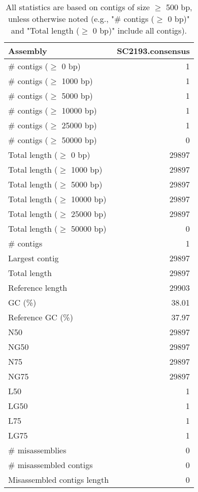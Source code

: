 \documentclass[12pt,a4paper]{article}
\begin{document}
\begin{table}[ht]
\begin{center}
\caption{All statistics are based on contigs of size $\geq$ 500 bp, unless otherwise noted (e.g., "\# contigs ($\geq$ 0 bp)" and "Total length ($\geq$ 0 bp)" include all contigs).}
\begin{tabular}{|l*{1}{|r}|}
\hline
Assembly & SC2193.consensus \\ \hline
\# contigs ($\geq$ 0 bp) & 1 \\ \hline
\# contigs ($\geq$ 1000 bp) & 1 \\ \hline
\# contigs ($\geq$ 5000 bp) & 1 \\ \hline
\# contigs ($\geq$ 10000 bp) & 1 \\ \hline
\# contigs ($\geq$ 25000 bp) & 1 \\ \hline
\# contigs ($\geq$ 50000 bp) & 0 \\ \hline
Total length ($\geq$ 0 bp) & 29897 \\ \hline
Total length ($\geq$ 1000 bp) & 29897 \\ \hline
Total length ($\geq$ 5000 bp) & 29897 \\ \hline
Total length ($\geq$ 10000 bp) & 29897 \\ \hline
Total length ($\geq$ 25000 bp) & 29897 \\ \hline
Total length ($\geq$ 50000 bp) & 0 \\ \hline
\# contigs & 1 \\ \hline
Largest contig & 29897 \\ \hline
Total length & 29897 \\ \hline
Reference length & 29903 \\ \hline
GC (\%) & 38.01 \\ \hline
Reference GC (\%) & 37.97 \\ \hline
N50 & 29897 \\ \hline
NG50 & 29897 \\ \hline
N75 & 29897 \\ \hline
NG75 & 29897 \\ \hline
L50 & 1 \\ \hline
LG50 & 1 \\ \hline
L75 & 1 \\ \hline
LG75 & 1 \\ \hline
\# misassemblies & 0 \\ \hline
\# misassembled contigs & 0 \\ \hline
Misassembled contigs length & 0 \\ \hline

\end{tabular}
\end{center}
\end{table}
\end{document}
